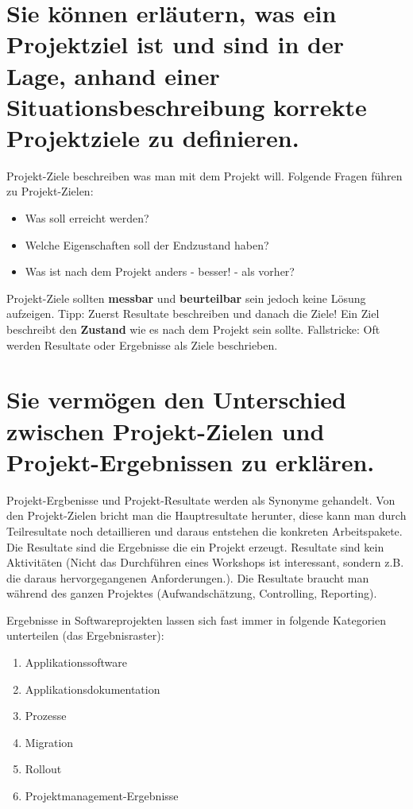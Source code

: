 \section{Sie können erläutern, was ein Projektziel ist und sind in der Lage, anhand einer Situationsbeschreibung korrekte Projektziele zu definieren.}

Projekt-Ziele beschreiben was man mit dem Projekt will. Folgende Fragen führen zu Projekt-Zielen:
\begin{itemize}
	\item Was soll erreicht werden?
	\item Welche Eigenschaften soll der Endzustand haben?
	\item Was ist nach dem Projekt anders - besser! - als vorher?
\end{itemize}
Projekt-Ziele sollten \textbf{messbar} und \textbf{beurteilbar} sein jedoch keine Lösung aufzeigen. Tipp: Zuerst Resultate beschreiben und danach die Ziele! Ein Ziel beschreibt den \textbf{Zustand} wie es nach dem Projekt sein sollte. Fallstricke: Oft werden Resultate oder Ergebnisse als Ziele beschrieben.

\section{Sie vermögen den Unterschied zwischen Projekt-Zielen und Projekt-Ergebnissen zu erklären.}

Projekt-Ergbenisse und Projekt-Resultate werden als Synonyme gehandelt. Von den Projekt-Zielen bricht man die Hauptresultate herunter, diese kann man durch Teilresultate noch detaillieren und daraus entstehen die konkreten Arbeitspakete.
Die Resultate sind die Ergebnisse die ein Projekt erzeugt. Resultate sind kein Aktivitäten (Nicht das Durchführen eines Workshops ist interessant, sondern z.B. die daraus hervorgegangenen Anforderungen.). Die Resultate braucht man während des ganzen Projektes (Aufwandschätzung, Controlling, Reporting).

Ergebnisse in Softwareprojekten lassen sich fast immer in folgende Kategorien unterteilen (das Ergebnisraster):

\begin{enumerate}
	\item Applikationssoftware
	\item Applikationsdokumentation
	\item Prozesse
	\item Migration
	\item Rollout
	\item Projektmanagement-Ergebnisse
\end{enumerate}